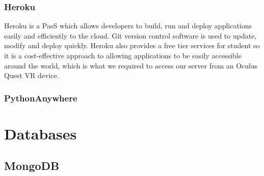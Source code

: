 \subsubsection{Heroku}
Heroku is a PasS which allows developers to build, run and deploy applications easily and efficiently to the cloud. Git version control software is used to update, modify and deploy quickly. Heroku also provides a free tier services for student so it is a cost-effective approach to allowing applications to be easily accessible around the world, which is what we required to access our server from an Oculus Quest VR device.

\subsubsection{PythonAnywhere}

\section{Databases}
\subsection{MongoDB}